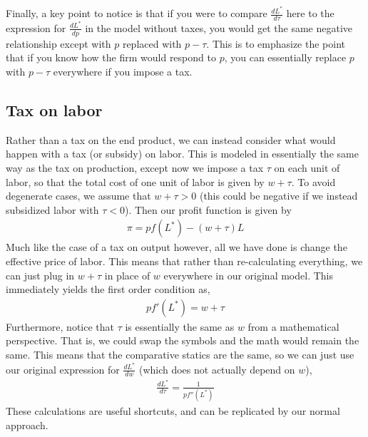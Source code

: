 Finally, a key point to notice is that if you were to compare $\frac{dL^*}{d\tau}$ here to the expression for $\frac{dL^*}{dp}$ in the model without taxes, you would get the same negative relationship except with $p$ replaced with $p - \tau$. This is to emphasize the point that if you know how the firm would respond to $p$, you can essentially replace $p$ with $p - \tau$ everywhere if you impose a tax. 

\subsection*{Tax on labor}
Rather than a tax on the end product, we can instead consider what would happen with a tax (or subsidy) on labor. This is modeled in essentially the same way as the tax on production, except now we impose a tax $\tau$ on each unit of labor, so that the total cost of one unit of labor is given by $w + \tau$. To avoid degenerate cases, we assume that $w + \tau > 0$ (this could be negative if we instead subsidized labor with $\tau < 0$). Then our profit function is given by
\begin{align*}
    \pi = p f(L^*) - (w + \tau) L
\end{align*}
Much like the case of a tax on output however, all we have done is change the effective price of labor. This means that rather than re-calculating everything, we can just plug in $w + \tau$ in place of $w$ everywhere in our original model. This immediately yields the first order condition as,
\begin{align*}
    p f'(L^*) = w + \tau
\end{align*}
Furthermore, notice that $\tau$ is essentially the same as $w$ from a mathematical perspective. That is, we could swap the symbols and the math would remain the same. This means that the comparative statics are the same, so we can just use our original expression for $\frac{dL^*}{dw}$ (which does not actually depend on $w$),
\begin{align*}
    \frac{dL^*}{d\tau}= \frac{1}{pf''(L^*)}
\end{align*}
These calculations are useful shortcuts, and can be replicated by our normal approach. 

